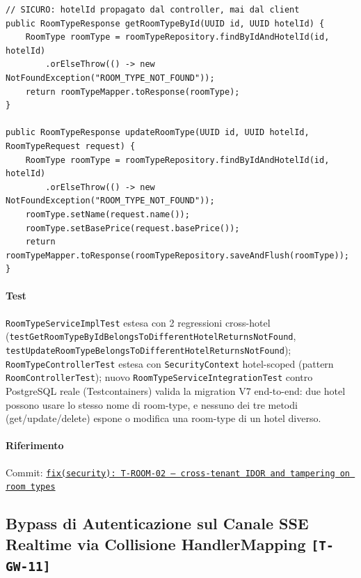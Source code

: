 ﻿\documentclass[a4paper,12pt]{report}
\newcommand{\commitref}[2]{\texttt{\small \href{https://github.com/diegoandruccioli/hotel-pms/commit/#1}{#2}}}
\newcommand{\threat}[1]{\texttt{\small\textcolor{vulnred}{[#1]}}}
\begin{document}
\begin{securebox}[title={Codice Sicuro --- RoomTypeServiceImpl.java (fix)}]
\begin{lstlisting}[style=java]
// SICURO: hotelId propagato dal controller, mai dal client
public RoomTypeResponse getRoomTypeById(UUID id, UUID hotelId) {
    RoomType roomType = roomTypeRepository.findByIdAndHotelId(id, hotelId)
        .orElseThrow(() -> new NotFoundException("ROOM_TYPE_NOT_FOUND"));
    return roomTypeMapper.toResponse(roomType);
}

public RoomTypeResponse updateRoomType(UUID id, UUID hotelId, RoomTypeRequest request) {
    RoomType roomType = roomTypeRepository.findByIdAndHotelId(id, hotelId)
        .orElseThrow(() -> new NotFoundException("ROOM_TYPE_NOT_FOUND"));
    roomType.setName(request.name());
    roomType.setBasePrice(request.basePrice());
    return roomTypeMapper.toResponse(roomTypeRepository.saveAndFlush(roomType));
}
\end{lstlisting}
\end{securebox}

\paragraph{Test}
\texttt{RoomTypeServiceImplTest} estesa con 2 regressioni cross-hotel
(\texttt{testGetRoomTypeByIdBelongsToDifferentHotelReturnsNotFound},
\texttt{testUpdateRoomTypeBelongsToDifferentHotelReturnsNotFound});
\texttt{RoomTypeControllerTest} estesa con \texttt{SecurityContext} hotel-scoped
(pattern \texttt{RoomControllerTest}); nuovo \texttt{RoomTypeServiceIntegrationTest}
contro PostgreSQL reale (Testcontainers) valida la migration V7 end-to-end: due hotel
possono usare lo stesso nome di room-type, e nessuno dei tre metodi
(get/update/delete) espone o modifica una room-type di un hotel diverso.

\paragraph{Riferimento} Commit: \commitref{121e4d0}{fix(security): T-ROOM-02 --- cross-tenant IDOR and tampering on room types}


\subsection{Bypass di Autenticazione sul Canale SSE Realtime via Collisione HandlerMapping \threat{T-GW-11}}
\end{document}
